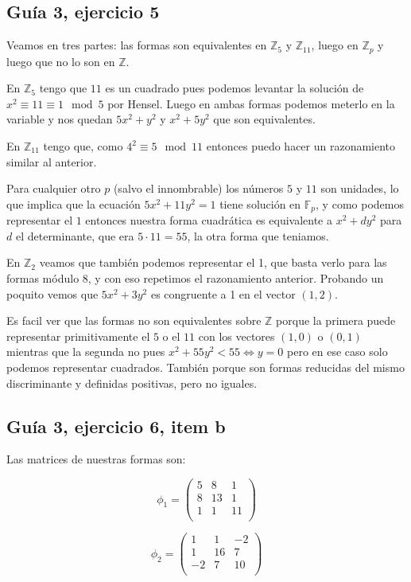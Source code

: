 \documentclass[12pt]{amsart}
\newcommand{\ZZ}{\mathbb{Z}}
\newcommand{\FF}{\mathbb{F}}
\newcommand{\lp}{\left(}
\newcommand{\rp}{\right)}
\theoremstyle{plain}
\begin{document}
\subsection*{Guía 3, ejercicio 5}

Veamos en tres partes: las formas son equivalentes en $\ZZ_5$
y $\ZZ_{11}$, luego en $\ZZ_p$ y luego que no lo son en $\ZZ$.

En $\ZZ_5$ tengo que $11$ es un cuadrado pues podemos levantar
la solución de $x^2 \equiv 11\equiv 1 \mod 5$ por Hensel. Luego en 
ambas formas podemos meterlo en la variable y nos quedan 
$5x^2+y^2$ y $x^2+5y^2$ que son equivalentes.

En $\ZZ_{11}$ tengo que, como $4^2 \equiv 5\mod 11$ 
entonces puedo hacer un razonamiento similar al anterior.

Para cualquier otro $p$ (salvo el innombrable) los números 
$5$ y $11$ son unidades, lo que implica que la ecuación 
$5x^2 + 11y^2=1$ tiene solución en $\FF_p$, y como podemos
representar el $1$ entonces nuestra forma cuadrática es
equivalente a $x^2+ d y^2$ para $d$ el determinante, que 
era $5\cdot 11 = 55$, la otra forma que teniamos. 

En $\ZZ_2$ veamos que también podemos representar el 1, que 
basta verlo para las formas módulo 8, y con eso repetimos el 
razonamiento anterior. Probando un poquito vemos que $5x^2
+3y^2$ es congruente a 1 en el vector $(1,2)$.

Es facil ver que las formas no son equivalentes sobre $\ZZ$
porque la primera puede representar primitivamente el $5$ o el 
$11$ con los vectores $(1,0)$ o $(0,1)$ mientras que la segunda
no pues $x^2 + 55y^2 < 55 \iff y=0$ pero en ese caso solo 
podemos representar cuadrados. También porque son formas
reducidas del mismo discriminante y definidas positivas, pero 
no iguales.

\subsection*{Guía 3, ejercicio 6, item b}

Las matrices de nuestras formas son:

\begin{multicols}{2}
$$\phi_1 = \lp
\begin{matrix}
    5&8&1 \\
    8&13&1 \\
    1&1&11 \\
\end{matrix}\rp$$

$$\phi_2 = \lp
\begin{matrix}
    1&1&-2 \\
    1&16&7 \\
    -2&7&10 \\
\end{matrix}\rp$$
\end{multicols}
\end{document}
